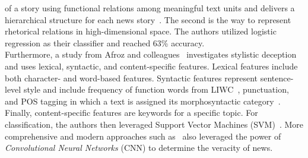 \begin{description}
\begin{itemize}
of a story using functional relations among meaningful text units and delivers a hierarchical structure for each news story~\parencite{RST_William}. The second is the way to represent rhetorical relations in high-dimensional space. The authors utilized logistic regression as their classifier and reached 63\% accuracy.\\Furthermore, a study from Afroz and colleagues~\parencite{DetectingHoaxesFraudsAndDeception_Afroz} investigates stylistic deception and uses lexical, syntactic, and content-specific features. Lexical features include both character- and word-based features. Syntactic features represent sentence-level style and include frequency of function words from LIWC~\parencite{LIWC2007_Pennebaker}, punctuation, and POS tagging in which a text is assigned its morphosyntactic category~\parencite{POS_Daelemans}. Finally, content-specific features are keywords for a specific topic. For classification, the authors then leveraged Support Vector Machines (SVM)~\parencite{SVM_Hearst}. More comprehensive and modern approaches such as~\parencite{LiarLiarPantsOnFire_Wang} also leveraged the power of \emph{Convolutional Neural Networks} (CNN) to determine the veracity of news.

\end{itemize}
\end{description}
